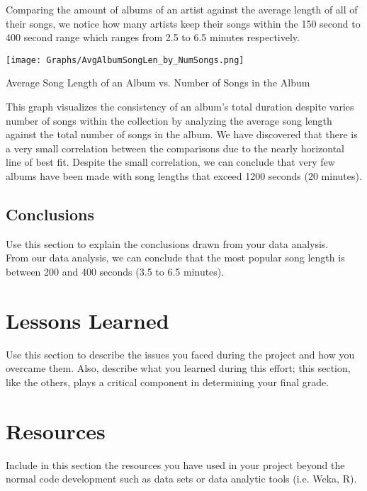 \documentclass[12pt]{article}
\begin{document}
    \vspace{0.5cm}

    \noindent Comparing the amount of albums of an artist against the average length
    of all of their songs, we notice how many artists keep their songs within the
    150 second to 400 second range which ranges from 2.5 to 6.5 minutes respectively.


    \begin{center}
        \texttt{[image: Graphs/AvgAlbumSongLen\_by\_NumSongs.png]}
    \end{center}
    \caption{Average Song Length of an Album vs. Number of Songs in the Album}
    \label{Avg Song Len of Album vs. Num Songs in Album}

    \vspace{0.5cm}

    \noindent This graph visualizes the consistency of an album's total duration
    despite varies number of songs within the collection by analyzing the average
    song length against the total number of songs in the album. We have discovered
    that there is a very small correlation between the comparisons due to the nearly
    horizontal line of best fit. Despite the small correlation, we can conclude that
    very few albums have been made with song lengths that exceed 1200 seconds
    (20 minutes).


    \subsection{Conclusions}
    Use this section to explain the conclusions drawn from your data analysis.\\

    From our data analysis, we can conclude that the most popular song length is
    between 200 and 400 seconds (3.5 to 6.5 minutes).

    \section{Lessons Learned}
    Use this section to describe the issues you faced during the project and how you overcame them. Also, describe what you learned during this effort; this section, like the others, plays a critical component in determining your final grade.\\


    \section{Resources}
    Include in this section the resources you have used in your project beyond the normal code development
    such as data sets or data analytic tools (i.e. Weka, R).
\end{document}
